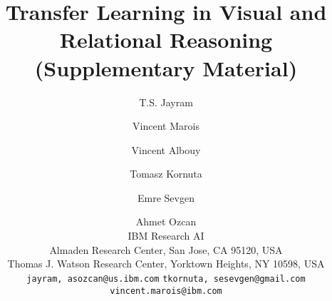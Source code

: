 \documentclass[10pt,letterpaper]{article}
\begin{document}
\title{Transfer Learning in Visual and Relational Reasoning\\ (Supplementary Material)}

\author{T.S. Jayram \and  Vincent Marois \and Vincent Albouy \and Tomasz Kornuta  \and Emre Sevgen \and Ahmet Ozcan\\
IBM Research AI\\
Almaden Research Center, San Jose, CA 95120, USA\\
Thomas J. Watson Research Center, Yorktown Heights, NY 10598, USA\\
{\tt\small {jayram,  asozcan}@us.ibm.com}
{\tt\small {tkornuta, sesevgen}@gmail.com}
{\tt\small vincent.marois@ibm.com}
}

\maketitle



\bigskip

\clearpage


\end{document}
